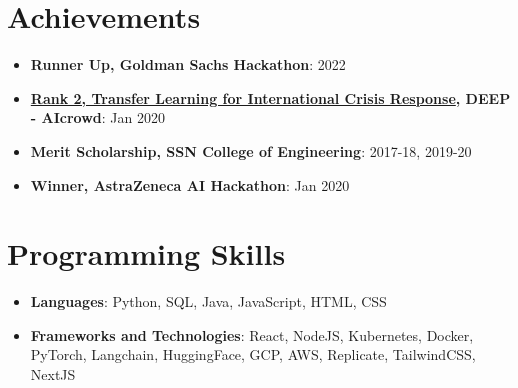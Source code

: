 \documentclass[letterpaper,11pt]{article}
\newcommand{\resumeItem}[2]{
  \item\small{
    \textbf{#1}{: #2 \vspace{-2pt}}
  }
}
\newcommand{\resumeSubItem}[2]{\resumeItem{#1}{#2}\vspace{-4pt}}
\newcommand{\resumeSubHeadingListStart}{\begin{itemize}[leftmargin=*]}
\newcommand{\resumeSubHeadingListEnd}{\end{itemize}}
\begin{document}
\section{Achievements}
  \resumeSubHeadingListStart
  \resumeSubItem
    {Runner Up, Goldman Sachs Hackathon}{2022}
  
  \resumeSubItem
    {\href{https://bit.ly/AMLDPresentationDEEP}{Rank 2, Transfer Learning for International Crisis Response}, DEEP - AIcrowd}{Jan 2020}
  \resumeSubItem
  {Merit Scholarship, SSN College of Engineering}{2017-18, 2019-20}
  \resumeSubItem
    {Winner, AstraZeneca AI Hackathon}{Jan 2020}

  \resumeSubHeadingListEnd


\section{Programming Skills}
  \resumeSubHeadingListStart
   \item{
     \textbf{Languages}{: Python, SQL, Java, JavaScript, HTML, CSS}
      }
      \item{
       \textbf{Frameworks and Technologies}{: React, NodeJS, Kubernetes, Docker, PyTorch, Langchain, HuggingFace, GCP, AWS, Replicate, TailwindCSS, NextJS}
    }
  \resumeSubHeadingListEnd
\end{document}
